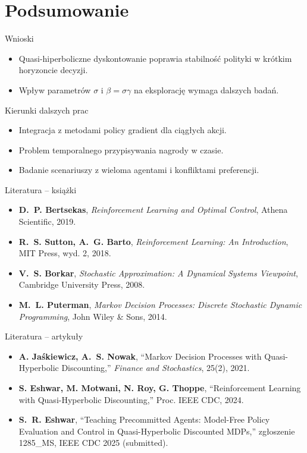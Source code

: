 \section{Podsumowanie}

\begin{frame}{Wnioski}
  \begin{itemize}
    \item Quasi-hiperboliczne dyskontowanie poprawia stabilność polityki w krótkim horyzoncie decyzji.
    \item Wpływ parametrów $\sigma$ i $\beta = \sigma\gamma$ na eksplorację wymaga dalszych badań.
  \end{itemize}
\end{frame}

\begin{frame}{Kierunki dalszych prac}
  \begin{itemize}
    \item Integracja z metodami policy gradient dla ciągłych akcji.
    \item Problem temporalnego przypisywania nagrody w czasie.
    \item Badanie scenariuszy z wieloma agentami i konfliktami preferencji.
  \end{itemize}
\end{frame}

\begin{frame}{Literatura -- książki}
  \small
  \begin{itemize}
    \item \textbf{D.~P. Bertsekas}, \emph{Reinforcement Learning and Optimal Control}, Athena Scientific, 2019.
    \item \textbf{R.~S. Sutton, A.~G. Barto}, \emph{Reinforcement Learning: An Introduction}, MIT Press, wyd. 2, 2018.
    \item \textbf{V.~S. Borkar}, \emph{Stochastic Approximation: A Dynamical Systems Viewpoint}, Cambridge University Press, 2008.
    \item \textbf{M.~L. Puterman}, \emph{Markov Decision Processes: Discrete Stochastic Dynamic Programming}, John Wiley \& Sons, 2014.
  \end{itemize}
\end{frame}

\begin{frame}{Literatura -- artykuły}
  \small
  \begin{itemize}
    \item \textbf{A. Jaśkiewicz, A.~S. Nowak}, ``Markov Decision Processes with Quasi-Hyperbolic Discounting,'' \emph{Finance and Stochastics}, 25(2), 2021.
    \item \textbf{S. Eshwar, M. Motwani, N. Roy, G. Thoppe}, ``Reinforcement Learning with Quasi-Hyperbolic Discounting,'' Proc. IEEE CDC, 2024.
    \item \textbf{S.~R. Eshwar}, ``Teaching Precommitted Agents: Model-Free Policy Evaluation and Control in Quasi-Hyperbolic Discounted MDPs,'' zgłoszenie 1285\_MS, IEEE CDC 2025 (submitted).
  \end{itemize}
\end{frame}
